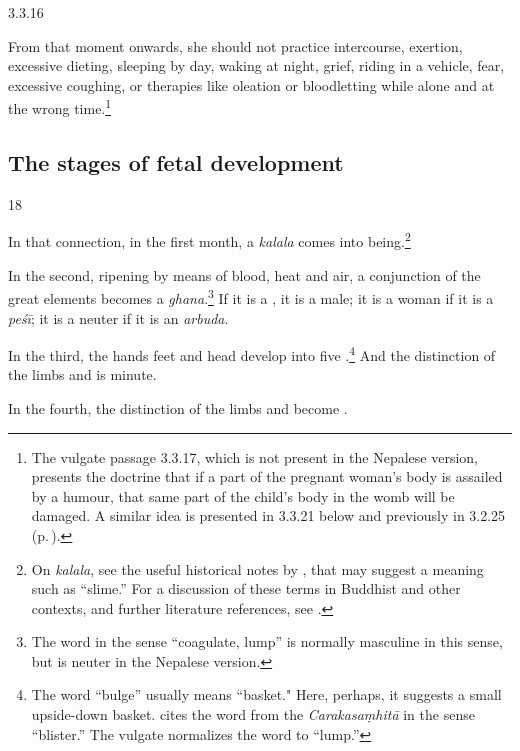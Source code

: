 \begin{translation}
\item[3.3.16]

From that moment onwards, she should not practice intercourse,
exertion, excessive dieting, sleeping by day, waking at night, grief,
riding in a vehicle, fear, excessive coughing, or therapies like
oleation or bloodletting while alone and at the wrong
time.\footnote{The vulgate passage 3.3.17, which is not present in the
    Nepalese version, presents the doctrine that if a part of the pregnant
    woman's body is assailed by a humour, that same part of the child's
    body in the womb will be damaged.  A similar idea is presented in 
    3.3.21 below and previously in 3.2.25 (p.\,\pageref{3.2.25}).}


\subsection{The stages of fetal development}

\item [18]

In that connection, in the first month, a \emph{kalala} comes into
being.\footnote{On \emph{kalala}, see the useful historical notes by
    \citet[535--536]{das-2003}, that may suggest a meaning such as
    “slime.”  For a discussion of these terms in Buddhist and other
    contexts, and further literature references, see
    \cite{agos-2004,krit-2013,krit-2009,sune-1991}. }
    
In the second, ripening by means of blood, heat and air, a conjunction
of the great elements becomes a \emph{ghana}.\footnote{The word
     in the sense “coagulate, lump” is normally masculine in
    this sense, but is neuter in the Nepalese version.}  If it is a
    , it is a male; it is a woman if it is a
    \emph{peśī}; it is a neuter if it is an \emph{arbuda}.
        
In the third, the hands feet and head develop into five
.\footnote{The word  “bulge” usually
    means “basket."  Here, perhaps, it suggests a small upside-down
    basket. \cite[652]{moni-sans} cites the word from the
    \emph{Carakasaṃhitā} in the sense “blister.”  The vulgate normalizes
    the word to  “lump.”}  And the distinction of the limbs
    and  is minute.
        
In the fourth, the distinction of the limbs and  become .  
    

\end{translation}
